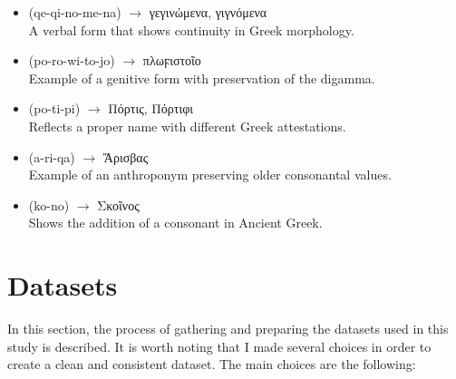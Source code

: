\begin{itemize}
    \item \textlinb{\Bqe\Bqi\Bno\Bme\Bna} (qe-qi-no-me-na) $\rightarrow$ \textgreek{γεγινώμενα}, \textgreek{γιγνόμενα} \\  
    A verbal form that shows continuity in Greek morphology.  

    \item \textlinb{\Bpo\Bro\Bwi\Bto\Bjo} (po-ro-wi-to-jo) $\rightarrow$ \textgreek{πλωϝιστοῖο} \\  
    Example of a genitive form with preservation of the digamma.  

    \item \textlinb{\Bpo\Bti\Bpi} (po-ti-pi) $\rightarrow$ \textgreek{Πόρτις}, \textgreek{Πόρτιφι} \\  
    Reflects a proper name with different Greek attestations.  

    \item \textlinb{\Ba\Bri\Bqa} (a-ri-qa) $\rightarrow$ \textgreek{Ἄρισβας} \\  
    Example of an anthroponym preserving older consonantal values.  

    \item \textlinb{\Bko\Bno} (ko-no) $\rightarrow$ \textgreek{Σκοῖνος} \\  
    Shows the addition of a consonant in Ancient Greek. 
\end{itemize}  

\section{Datasets}
In this section, the process of gathering and preparing the datasets used in this study is described.  
It is worth noting that I made several choices in order to create a clean and consistent dataset.  
The main choices are the following:

